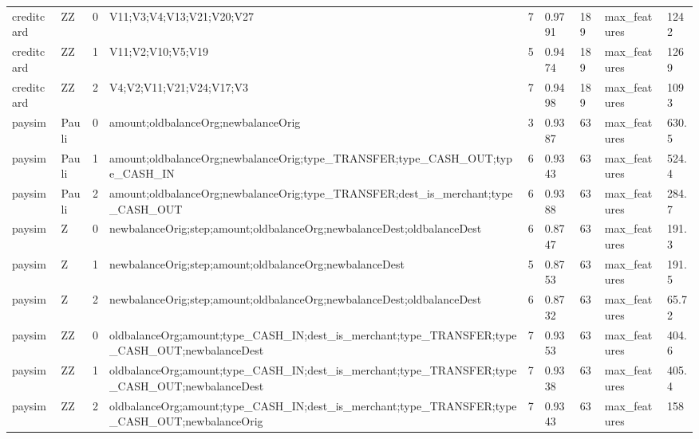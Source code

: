 \begin{table}[t]
{\begin{tabular}{lllllllll}
creditcard & ZZ & 0 & V11;V3;V4;V13;V21;V20;V27 & 7 & 0.9791 & 189 & max\_features & 1242 \\
creditcard & ZZ & 1 & V11;V2;V10;V5;V19 & 5 & 0.9474 & 189 & max\_features & 1269 \\
creditcard & ZZ & 2 & V4;V2;V11;V21;V24;V17;V3 & 7 & 0.9498 & 189 & max\_features & 1093 \\
paysim & Pauli & 0 & amount;oldbalanceOrg;newbalanceOrig & 3 & 0.9387 & 63 & max\_features & 630.5 \\
paysim & Pauli & 1 & amount;oldbalanceOrg;newbalanceOrig;type\_TRANSFER;type\_CASH\_OUT;type\_CASH\_IN & 6 & 0.9343 & 63 & max\_features & 524.4 \\
paysim & Pauli & 2 & amount;oldbalanceOrg;newbalanceOrig;type\_TRANSFER;dest\_is\_merchant;type\_CASH\_OUT & 6 & 0.9388 & 63 & max\_features & 284.7 \\
paysim & Z & 0 & newbalanceOrig;step;amount;oldbalanceOrg;newbalanceDest;oldbalanceDest & 6 & 0.8747 & 63 & max\_features & 191.3 \\
paysim & Z & 1 & newbalanceOrig;step;amount;oldbalanceOrg;newbalanceDest & 5 & 0.8753 & 63 & max\_features & 191.5 \\
paysim & Z & 2 & newbalanceOrig;step;amount;oldbalanceOrg;newbalanceDest;oldbalanceDest & 6 & 0.8732 & 63 & max\_features & 65.72 \\
paysim & ZZ & 0 & oldbalanceOrg;amount;type\_CASH\_IN;dest\_is\_merchant;type\_TRANSFER;type\_CASH\_OUT;newbalanceDest & 7 & 0.9353 & 63 & max\_features & 404.6 \\
paysim & ZZ & 1 & oldbalanceOrg;amount;type\_CASH\_IN;dest\_is\_merchant;type\_TRANSFER;type\_CASH\_OUT;newbalanceDest & 7 & 0.9338 & 63 & max\_features & 405.4 \\
paysim & ZZ & 2 & oldbalanceOrg;amount;type\_CASH\_IN;dest\_is\_merchant;type\_TRANSFER;type\_CASH\_OUT;newbalanceOrig & 7 & 0.9343 & 63 & max\_features & 158 \\
\hline
\end{tabular}}
\end{table}
